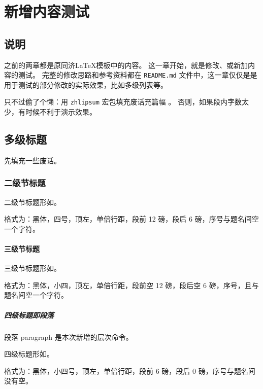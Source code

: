 \documentclass[../Main/thesis]{subfiles}
\begin{document}
\chapter{新增内容测试}
\label{cha:new}

\section{说明}
\label{sec:new-intro}

之前的两章都是原同济LaTeX模板中的内容。
这一章开始，就是修改、或新加内容的测试\cite{mohrssBIM}。
完整的修改思路和参考资料都在 \texttt{README.md} 文件中，这一章仅仅是是用于测试的部分修改的实际效果，比如多级列表等。

只不过偷了个懒：用 \verb|zhlipsum| 宏包填充废话充篇幅 \cite{HowDigital}。
否则，如果段内字数太少，有时候不利于演示效果。

\section{多级标题} \label{sec:seclv}

先填充一些废话。\zhlipsum[4]

\subsection{二级节标题} \label{ssc:subsec2}

二级节标题形如。

格式为：黑体，四号，顶左，单倍行距，段前 12 磅，段后 6 磅，序号与题名间空一个字符。

\subsubsection{三级节标题} \label{sss:subsub3}

三级节标题形如。

格式为：黑体，小四，顶左，单倍行距，段前空 12 磅，段后空 6 磅，序号，且与题名间空一个字符。

\paragraph{四级标题即段落} \label{par:par4}

段落 paragraph 是本次新增的层次命令。

四级标题形如。

格式为：黑体，小四号，顶左，单倍行距，段前 6 磅，段后 0 磅，序号与题名间没有空。
\end{document}
